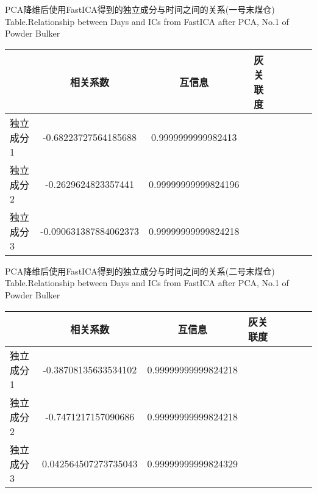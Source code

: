 \begin{table}[!h]
\begin{center}
		{PCA降维后使用FastICA得到的独立成分与时间之间的关系(一号末煤仓)}
			{Table.}{Relationship between Days and ICs from FastICA after PCA, No.1 of Powder Bulker}
\begin{tabular}{lccclccc}
\toprule
                & 相关系数     					& 互信息      					&灰关联度 \\
\midrule
  独立成分1     &  -0.68223727564185688  	& 0.9999999999982413   		&    \\
  独立成分2     &  -0.2629624823357441	      	& 0.99999999999824196   	&    \\
  独立成分3     &  -0.090631387884062373	& 0.99999999999824218   	&    \\
 \bottomrule
\end{tabular}
\end{center}
\end{table}

\begin{table}[!h]
\begin{center}
		{PCA降维后使用FastICA得到的独立成分与时间之间的关系(二号末煤仓)}
			{Table.}{Relationship between Days and ICs from FastICA after PCA, No.1 of Powder Bulker}
\begin{tabular}{lccclccc}
\toprule
                & 相关系数     					& 互信息      					&灰关联度 \\
\midrule
  独立成分1     &  -0.38708135633534102  	& 0.99999999999824218 		&    \\
  独立成分2     &  -0.7471217157090686	      	& 0.99999999999824218   	&    \\
  独立成分3     &  0.042564507273735043	& 0.99999999999824329   	&    \\
 \bottomrule
\end{tabular}
\end{center}
\end{table}

